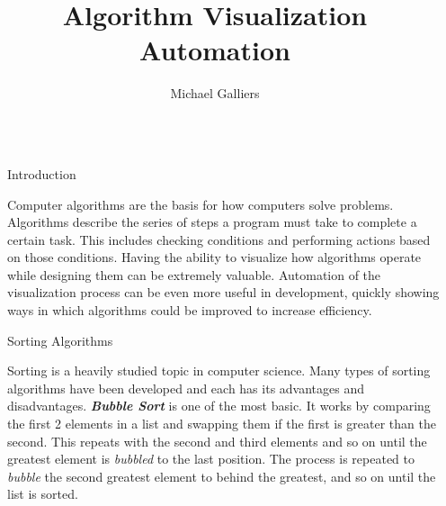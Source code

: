 \documentclass[final]{beamer}
\title{Algorithm Visualization Automation} %
\author{Michael Galliers} %
\institute{Eastern Kentucky University - Department of Computer Science} %
\newlength{\sepwid}
\newlength{\onecolwid}
\begin{document}

\setlength{\belowcaptionskip}{2ex} %
\setlength\belowdisplayshortskip{2ex} %

\begin{frame}[t] %

\begin{columns}[t]

\begin{column}{\sepwid}\end{column} %

\begin{column}{\onecolwid} %


\begin{block}{Introduction}

Computer algorithms are the basis for how computers solve problems. Algorithms describe the series
of steps a program must take to complete a certain task. This includes checking conditions and
performing actions based on those conditions. Having the ability to visualize how algorithms operate
while designing them can be extremely valuable. Automation of the visualization process can be even
more useful in development, quickly showing ways in which algorithms could be improved to increase
efficiency.

\end{block}


\begin{block}{Sorting Algorithms}

Sorting is a heavily studied topic in computer science. Many types of sorting algorithms have been
developed and each has its advantages and disadvantages. \textit{\textbf{Bubble Sort}} is one of the
most basic. It works by comparing the first 2 elements in a list and swapping them if the first is
greater than the second. This repeats with the second and third elements and so on until the
greatest element is \textit{bubbled} to the last position. The process is repeated to
\textit{bubble} the second greatest element to behind the greatest, and so on until the list is
sorted.


\end{block}
\end{column}
\end{columns}
\end{frame}
\end{document}
